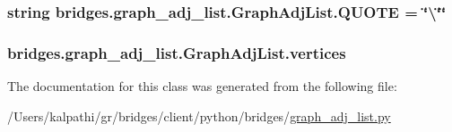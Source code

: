 \subsubsection[{Q\+U\+O\+T\+E}]{\setlength{\rightskip}{0pt plus 5cm}string bridges.\+graph\+\_\+adj\+\_\+list.\+Graph\+Adj\+List.\+Q\+U\+O\+T\+E = \char`\"{}\textbackslash{}\char`\"{}\char`\"{}\hspace{0.3cm}{\ttfamily [static]}}\label{classbridges_1_1graph__adj__list_1_1_graph_adj_list_a57d3be43c5cd9a2895e2d2ef716b40c8}
\hypertarget{classbridges_1_1graph__adj__list_1_1_graph_adj_list_a6d1115214ceb8c77fe886e78de19f691}{}
\subsubsection[{vertices}]{\setlength{\rightskip}{0pt plus 5cm}bridges.\+graph\+\_\+adj\+\_\+list.\+Graph\+Adj\+List.\+vertices}\label{classbridges_1_1graph__adj__list_1_1_graph_adj_list_a6d1115214ceb8c77fe886e78de19f691}


The documentation for this class was generated from the following file\+:\begin{DoxyCompactItemize}
\item 
/\+Users/kalpathi/gr/bridges/client/python/bridges/\hyperlink{graph__adj__list_8py}{graph\+\_\+adj\+\_\+list.\+py}\end{DoxyCompactItemize}
